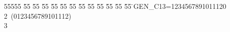 %
%
\begin{tabbing}
55555 \= 55 \= 55 \= 55 \= 55 \= 55 \= 55 \= 55 \= 55 \= 55 \= 55 \= 55 \= 55 \= \>GEN\_C13=1234567891011120\\[0pt]
2\>\ (0123456789101112)\\[0pt]
3\>\end{tabbing}
